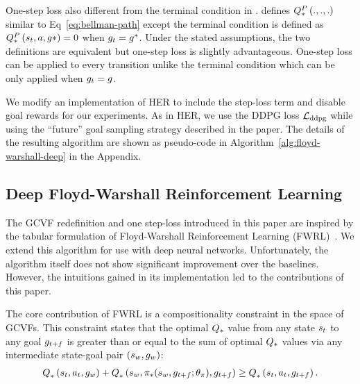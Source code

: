 One-step loss also different from the terminal condition in
\citet{kaelbling1993learning}. \citet{kaelbling1993learning} defines
$\fwargs{.}{.}{.}{*}{P}$ similar to Eq~\eqref{eq:bellman-path}
except the terminal condition is defined as $\fwargs{\state_t}{\act}{\goal*}{*}{P}
= 0$ when $\goal_t = \goal^*$. Under the stated assumptions, the two definitions
are equivalent but one-step loss is slightly advantageous.
One-step loss can be applied to every transition unlike
the \cite{kaelbling1993learning} terminal condition which can be only applied
when $\goal_t = \goal$.


We modify an implementation of HER to include the step-loss term and disable goal
rewards for our experiments.
As in HER, we use the DDPG loss $\LossDDPG$ while
using the ``future'' goal sampling strategy described in the paper.
The details of the resulting algorithm are shown as pseudo-code in
Algorithm~\ref{alg:floyd-warshall-deep} in the Appendix.

\subsection{Deep Floyd-Warshall Reinforcement Learning}

The GCVF redefinition and one step-loss introduced in this paper are inspired by
the tabular formulation of Floyd-Warshall
Reinforcement Learning (FWRL)~\citep{kaelbling1993learning}.
We extend this algorithm for use with deep neural networks.
Unfortunately, the algorithm itself does not show significant improvement over
the baselines. However, the intuitions gained in its implementation led to
the contributions of this paper. 

The core contribution of FWRL is a compositionality constraint in the space
of GCVFs. 
This constraint states that the optimal $\Q_*$ value 
from any state $\state_t$ to any goal $\goal_{t+f}$ is greater than or equal to
the sum of optimal $\Q_*$ values via any intermediate state-goal pair $(\state_{w}, \goal_{w})$:
%
\begin{align}
      \fwargs{\state_{t}}{\act_t}{\goal_{w}}{*}{}
      + \fwargs{\state_{w}}{\policy_*(\state_{w}, \goal_{t+f};\param_\policy)}{\goal_{t+f}}{*}{}
      \ge \fwargs{\state_{t}}{\act_t}{\goal_{t+f}}{*}{}.
\end{align}%
% 

